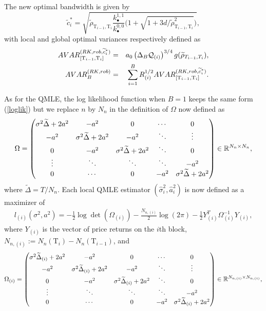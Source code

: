 \documentclass[11pt]{article}
\numberwithin{equation}{section}
\newcommand{\Tau}{\mathrm{T}}
\theoremstyle{plain}
\theoremstyle{remark}
\begin{document}
The new optimal bandwidth is given by 
$$\widetilde{c}_i^* = \sqrt{\widetilde{\rho}_{\Tau_{i-1}, \Tau_i}  \frac{k_{\bullet}^{1,1}}{k_{\bullet}^{0,0}} \bigg( 1 + \sqrt{1 + 3 d / \widetilde{\rho}_{\Tau_{i-1}, \Tau_i}^2} \bigg)},$$
with local and global optimal variances respectively defined as
\begin{eqnarray*}
AVAR_{[\Tau_{i-1}, \Tau_i]}^{(RK,rob,\widetilde{c}_i^*)} & = & a_0 \l( \Delta_B \calq_{(i)} \r)^{3/4} g (\widetilde{\rho}_{T_{i-1},T_i}),\\
AVAR_{B}^{(RK,rob)} & = & \sum_{i=1}^B  R_{(i)}^{1/2} AVAR_{[\Tau_{i-1}, \Tau_i]}^{(RK,rob,\widetilde{c}_i^*)}.
\end{eqnarray*}

\smallskip
As for the QMLE, the log likelihood function when $B=1$ keeps the same form (\ref{loglik}) but we replace $n$ by $N_n$ in the definition of $\Omega$ now defined as 
$$\Omega = \left(\begin{matrix}
                    \sigma^2 \widetilde{\Delta}+ 2 a^2 & - a^2 & 0 & \cdots & 0 \\
                    - a^2 & \sigma^2 \widetilde{\Delta}+ 2 a^2 & - a^2 & \ddots & \vdots \\
                    0 & - a^2 & \sigma^2 \widetilde{\Delta}+ 2 a^2 & \ddots & 0\\
                    \vdots & \ddots & \ddots & \ddots & - a^2\\
                    0 & \cdots & 0 & - a^2 & \sigma^2 \widetilde{\Delta}+ 2 a^2
                  \end{matrix}\right) \in \mathbb{R}^{N_n\times N_n},\\[12pt] $$
where $\widetilde{\Delta} = T/N_n$. Each local QMLE estimator $(\widehat{\sigma}_i^2, \widehat{a}_i^2)$ is now defined as a maximizer of 
\begin{eqnarray}
\label{loglikRobust}
l_{(i)}(\sigma^2, a^2) = - \frac{1}{2} \log \det(\Omega_{(i)}) - \frac{N_{n,(i)}}{2} \log (2\pi) -\frac{1}{2} Y_{(i)}^T \Omega_{(i)}^{-1} Y_{(i)},
\end{eqnarray}
where $Y_{(i)}$ is the vector of price returns on the $i$th block, $N_{n,(i)} := N_n(\Tau_{i}) - N_n(\Tau_{i-1})$, and 
$$\Omega_{(i)} = \left(\begin{matrix}
                    \sigma^2 \widetilde{\Delta}_{(i)}+ 2 a^2 & - a^2 & 0 & \cdots & 0 \\
                    - a^2 & \sigma^2 \widetilde{\Delta}_{(i)}+ 2 a^2 & - a^2 & \ddots & \vdots \\
                    0 & - a^2 & \sigma^2 \widetilde{\Delta}_{(i)}+ 2 a^2 & \ddots & 0\\
                    \vdots & \ddots & \ddots & \ddots & - a^2\\
                    0 & \cdots & 0 & - a^2 & \sigma^2 \widetilde{\Delta}_{(i)}+ 2 a^2
                  \end{matrix}\right) \in \mathbb{R}^{N_{n,(i)}\times N_{n,(i)}},\\[12pt] $$
\end{document}
